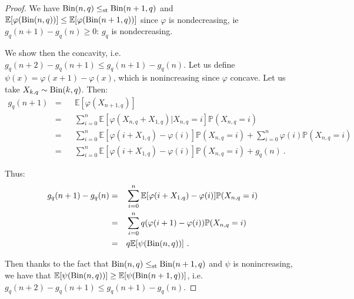 \begin{proof}
  We have $\operatorname{\text{Bin}}(n,q) \leq_{\text{st}} \operatorname{\text{Bin}}(n+1,q)$ and $\mathbb{E}[\varphi(\operatorname{\text{Bin}}(n,q))] \leq \mathbb{E}[\varphi(\operatorname{\text{Bin}}(n+1,q))]$ since $\varphi$ is nondecreasing, ie $g_q(n+1) - g_q(n) \geq 0$: $g_q$ is nondecreasing.

  We show then the concavity, i.e. $g_q(n+2) - g_q(n+1) \leq g_q(n+1) - g_q(n)$. Let us define $\psi(x) = \varphi(x+1)-\varphi(x)$, which is nonincreasing since $\varphi$ concave. Let us take $X_{k,q} \sim \operatorname{\text{Bin}}(k,q)$. Then:
  \begin{equation}
    \begin{aligned}
      g_q(n+1) &=&& \mathbb{E}[\varphi(X_{n+1,q})]\\
      &=&& \sum_{i=0}^n \mathbb{E}[\varphi(X_{n,q}+X_{1,q})|X_{n,q}=i]\mathbb{P}(X_{n,q}=i)\\
      &=&& \sum_{i=0}^n \mathbb{E}[\varphi(i+X_{1,q}) - \varphi(i)]\mathbb{P}(X_{n,q}=i) + \sum_{i=0}^n \varphi(i)\mathbb{P}(X_{n,q}=i)\\
      &=&& \sum_{i=0}^n \mathbb{E}[\varphi(i+X_{1,q}) - \varphi(i)]\mathbb{P}(X_{n,q}=i) + g_q(n)\ .
    \end{aligned}
  \end{equation}

  Thus:
  \begin{equation}
    \begin{aligned}
      g_q(n+1) -g_q(n) &=&& \sum_{i=0}^n \mathbb{E}[\varphi(i+X_{1,q}) - \varphi(i)]\mathbb{P}(X_{n,q}=i)\\
      &=&& \sum_{i=0}^n q(\varphi(i+1) - \varphi(i))\mathbb{P}(X_{n,q}=i)\\
      &=&& q \mathbb{E}[\psi(\operatorname{\text{Bin}}(n,q))]\ .
    \end{aligned}
  \end{equation}

  Then thanks to the fact that  $\operatorname{\text{Bin}}(n,q) \leq_{\text{st}} \operatorname{\text{Bin}}(n+1,q)$ and $\psi$ is nonincreasing, we have that $\mathbb{E}[\psi(\operatorname{\text{Bin}}(n,q))] \geq \mathbb{E}[\psi(\operatorname{\text{Bin}}(n+1,q))]$, i.e. $g_q(n+2) - g_q(n+1) \leq g_q(n+1) - g_q(n)$.
\end{proof}



